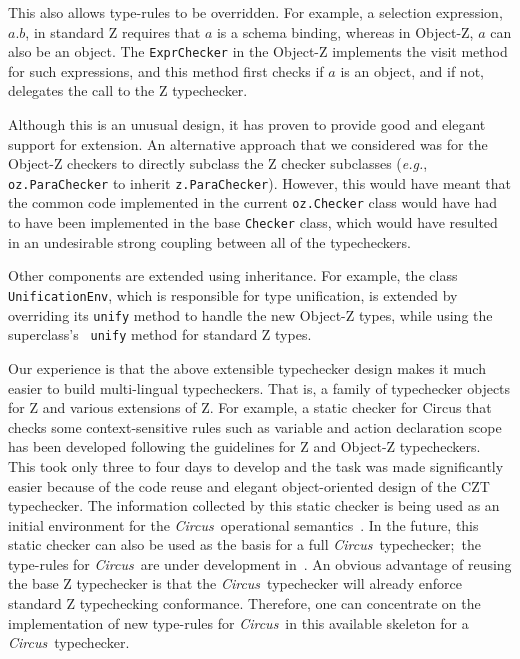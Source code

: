 \documentclass{llncs}
\newcommand{\Circus}{{\sf\slshape Circus}}
\begin{document}
This also allows type-rules to be overridden. For example, a
selection expression, $a.b$, in standard Z requires that $a$ is a
schema binding, whereas in Object-Z, $a$ can also be an object. The
{\tt ExprChecker} in the Object-Z implements the visit method for such
expressions, and this method first checks if $a$ is an object, and if
not, delegates the call to the Z typechecker.


Although this is an unusual design, it has proven to provide good
and elegant support for extension.  An alternative approach that we
considered was for the Object-Z checkers to directly subclass the Z
checker subclasses (\textit{e.g.}, \texttt{oz.ParaChecker} to inherit
\texttt{z.ParaChecker}).  However, this would have meant that the
common code implemented in the current
\texttt{oz.Checker} class would have had to have been
implemented in the base {\tt Checker} class, which would have resulted
in an undesirable strong coupling between all of the typecheckers.

Other components are extended using inheritance.  For example, the
class \texttt{UnificationEnv}, which is responsible for type
unification, is extended by overriding its {\tt unify} method to
handle the new Object-Z types, while using the superclass's {\tt
unify} method for standard Z types.

Our experience is that the above extensible typechecker design makes
it much easier to build multi-lingual typecheckers.  That is, a family
of typechecker objects for Z and various extensions of Z.
%
For example, a static checker for Circus that checks some
context-sensitive rules such as variable and action declaration scope
has been developed following the guidelines for Z and Object-Z
typecheckers. This took only three to four days to develop and the task was
made significantly easier because of the code reuse and elegant
object-oriented design of the CZT typechecker.  The information
collected by this static checker is being used as an initial
environment for the \Circus\ operational
semantics~\cite{circus.mc:opsem}.  In the future, this static checker
can also be used as the basis for a full \Circus\ typechecker;~the
type-rules for \Circus\ are under development in~\cite{circus.other:typechecker}.
An obvious advantage of reusing the base Z typechecker is that the \Circus\ typechecker
will already enforce standard Z typechecking conformance.  Therefore, one can
concentrate on the implementation of new type-rules for \Circus\ in
this available skeleton for a \Circus\ typechecker.
\end{document}
